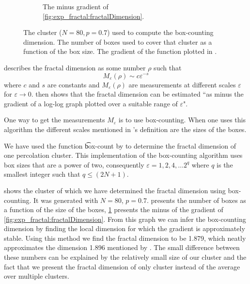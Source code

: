 \begin{figure}
\begin{subfigure}[t]{0.3\textwidth}
		\caption{The minus gradient of \cref{fig:exp_fractal:fractalDimension}.}
		\label{fig:exp_fractal:fractalDimensionGradient}
	\end{subfigure}		
	\caption{ The cluster ($N = 80, p = 0.7$) used to compute the box-counting dimension.  The number of boxes used to cover that cluster as a function of the box size.  The gradient of the function plotted in .}
	\label{fig:exp:dimension:plaatjes}
\end{figure}

\textcite{falconer2004fractal} describes the fractal dimension as some number $\rho$ such that
\begin{equation}
	M_\varepsilon(\rho) \sim c\varepsilon^{-s}
\end{equation}
where $c$ and $s$ are constants and $M_\varepsilon(\rho)$ are measurements at different scales $\varepsilon$ for $\varepsilon \to 0$. \citeauthor{falconer2004fractal} then shows that the fractal dimension can be estimated ``as minus the gradient of a log-log graph plotted over a suitable range of $\varepsilon$". 

One way to get the measurements $M_\varepsilon$ is to use box-counting. When one uses this algorithm the different scales mentioned in \citeauthor{falconer2004fractal}'s definition are the sizes of the boxes.

We have used the function \t{box-count} by \textcite{boxCounting} to determine the fractal dimension of one percolation cluster. This implementation of the box-counting algorithm uses box sizes that are a power of two, consequently $\varepsilon = 1, 2, 4, \dotsc 2^q$ where $q$ is the smallest integer such that $q \leq (2N + 1)$. 

 shows the cluster of which we have determined the fractal dimension using box-counting. It was generated with $N = 80$, $p = 0.7$.  presents the number of boxes as a function of the size of the boxes, \cref{fig:exp_fractal:fractalDimensionGradient} presents the minus of the gradient of \cref{fig:exp_fractal:fractalDimension}. From this graph we can infer the box-counting dimension by finding the local dimension for which the gradient is approximately stable. Using this method we find the fractal dimension to be \num{1.879}, which neatly approximates the dimension \num{1.896} mentioned by \textcite{stauffer1994introduction}. The small difference between these numbers can be explained by the relatively small size of our cluster and the fact that we present the fractal dimension of only cluster instead of the average over multiple clusters. 